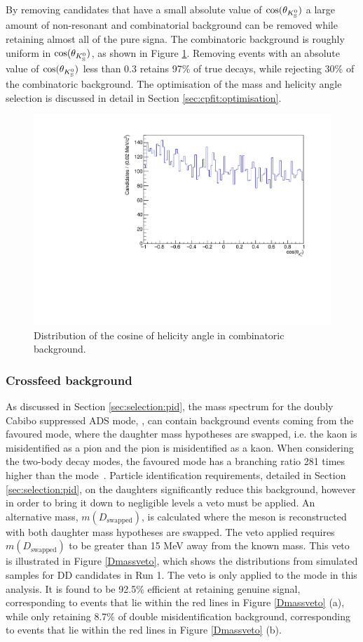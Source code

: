 By removing candidates that have a small absolute value of $\cos(\theta_{{{K}^0_{\mathrm{ \scriptscriptstyle S}}}})$ a large amount of non-resonant \decay{\Bm}{\D\KS\pim} and combinatorial background can be removed while retaining almost all of the pure \decay{\Bm}{\D\Kstarm} signa. The combinatoric background is roughly uniform in $\cos(\theta_{{{K}^0_{\mathrm{ \scriptscriptstyle S}}}})$, as shown in Figure \ref{Kshelicitybkg}. Removing events with an absolute value of $\cos(\theta_{{{K}^0_{\mathrm{ \scriptscriptstyle S}}}})$ less than 0.3 retains 97\% of true \decay{\Bm}{\D\Kstarm} decays, while rejecting 30\% of the combinatoric background. The optimisation of the \Kstarm mass and \KS helicity angle selection is discussed in detail in Section \ref{sec:cpfit:optimisation}.

\begin{figure}
\centering
\includegraphics[width=0.5\linewidth]{figures/backgrounds/Kshelicity_background.pdf}
\caption{Distribution of the cosine of \KS helicity angle in \kpi combinatoric background.}
\label{Kshelicitybkg}
\end{figure}

\subsubsection{Crossfeed background}
\label{sec:backgrounds:crossfeed}

As discussed in Section \ref{sec:selection:pid}, the \Bm mass spectrum for the doubly Cabibo suppressed ADS mode, \pik, can contain background events coming from the favoured \kpi mode, where the \Dz daughter mass hypotheses are swapped, i.e. the kaon is misidentified as a pion and the pion is misidentified as a kaon. When considering the two-body \Dz decay modes, the favoured \kpi mode has a branching ratio 281 times higher than the \pik mode~\cite{PDG2016}. Particle identification requirements, detailed in Section \ref{sec:selection:pid}, on the \Dz daughters significantly reduce this background, however in order to bring it down to negligible levels a veto must be applied. An alternative \Dz mass, $m(D_{\text{swapped}})$, is calculated where the \Dz meson is reconstructed with both daughter mass hypotheses are swapped. The veto applied requires $m(D_{\text{swapped}})$ to be greater than 15 MeV away from the known \Dz mass. This veto is illustrated in Figure \ref{Dmassveto}, which shows the distributions from simulated samples for DD candidates in Run 1. The veto is only applied to the \pik mode in this analysis. It is found to be 92.5\% efficient at retaining genuine signal, corresponding to events that lie within the red lines in Figure \ref{Dmassveto} (a), while only retaining 8.7\% of double misidentification background, corresponding to events that lie within the red lines in Figure \ref{Dmassveto} (b). 

